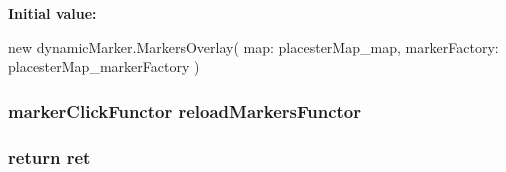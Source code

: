 \label{dc/d04/listings__map_8php_a8c0f29b502140312a60d863874ac03f1}
{\bfseries Initial value:}
\begin{DoxyCode}
 new dynamicMarker.MarkersOverlay(
        {
            map: placesterMap_map, 
            markerFactory: placesterMap_markerFactory
        })
\end{DoxyCode}
\hypertarget{listings__map_8php_a5c2973f135c0d639b88938783dcededf}{
\subsubsection[{reloadMarkersFunctor}]{\setlength{\rightskip}{0pt plus 5cm}markerClickFunctor {\bf reloadMarkersFunctor}}}
\label{dc/d04/listings__map_8php_a5c2973f135c0d639b88938783dcededf}
\hypertarget{listings__map_8php_a339672ff94e6199019102f50d317c3d7}{
\subsubsection[{ret}]{\setlength{\rightskip}{0pt plus 5cm}return {\bf ret}}}
\label{dc/d04/listings__map_8php_a339672ff94e6199019102f50d317c3d7}
